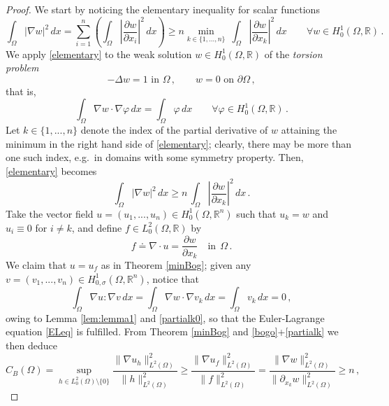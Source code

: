 \documentclass[11pt]{article}
\theoremstyle{plain}
\theoremstyle{definition}
\numberwithin{equation}{section}
\newcommand{\R}{\mathbb{R}}
\begin{document}
\noindent\begin{proof} We start by noticing the elementary inequality for scalar functions
	\begin{equation}\label{elementary}
	\int_\Omega|\nabla w|^2 \, dx=\sum_{i=1}^{n} \left( \int_\Omega \left| \dfrac{\partial w}{\partial x_{i}} \right|^2 \, dx \right) \ge n \min_{k \in \{1,...,n \} }\ \int_\Omega \left| \dfrac{\partial w}{\partial x_{k}} \right|^2\, dx \qquad
	\forall w\in H^1_0(\Omega, \mathbb{R})\, .
	\end{equation}
	We apply \eqref{elementary} to the weak solution $w\in H^1_0(\Omega, \mathbb{R})$ of the {\em torsion problem}
\begin{equation}\label{torsionpb}
- \Delta w = 1\mbox{ in }\Omega \, ,\qquad w = 0\mbox{ on }\partial \Omega \, ,
\end{equation}
that is,
\begin{equation}\label{partialk0}
\int_\Omega \nabla w \cdot \nabla \varphi \, dx = \int_\Omega \varphi \, dx\qquad \forall \varphi \in H^1_0(\Omega, \mathbb{R}) \, .
\end{equation}
Let  $k\in\{1,...,n\}$ denote  the index of the partial derivative of $w$ attaining the minimum in the right hand side of \eqref{elementary};
	clearly, there may be more than one such index, e.g.\ in domains with some symmetry property. Then, \eqref{elementary} becomes
	\begin{equation}\label{partialk}
	\int_\Omega|\nabla w|^2 \, dx\ge n\, \int_\Omega \left| \dfrac{\partial w}{\partial x_{k}} \right|^2 \, dx \, .
	\end{equation}
	Take the vector field $u=(u_1,...,u_n)\in H^1_0(\Omega, \mathbb{R}^{n})$ such that $u_k=w$ and $u_i\equiv0$ for $i\neq k$, and define $f \in L_{0}^{2}(\Omega, \R)$ by
	$$
	f\doteq\nabla\cdot u=\dfrac{\partial w}{\partial x_{k}} \quad \text{in} \ \ \Omega \, .
	$$
	We claim that $u = u_f$ as in Theorem \ref{minBog}; given any $v = (v_{1},...,v_{n}) \in H^{1}_{0,\sigma}(\Omega, \mathbb{R}^{n})$, notice that
	$$
	\int_{\Omega} \nabla u : \nabla v \, dx= \int_{\Omega} \nabla w \cdot \nabla v_{k}\, dx = \int_{\Omega} v_{k}\, dx = 0 \, ,
	$$
	owing to Lemma \ref{lem:lemma1} and \eqref{partialk0}, so that the Euler-Lagrange equation \eqref{ELeq} is fulfilled.
	From Theorem \ref{minBog} and \eqref{bogo}+\eqref{partialk} we then deduce
	$$
	C_B(\Omega)=\sup_ {h \in L^2_0(\Omega) \setminus \{0\}}\frac{\|\nabla u_h\|_{L^2(\Omega)}^2}{\|h\|_{L^2(\Omega)}^2} \geq \frac{\|\nabla u_f\|_{L^2(\Omega)}^2}{\|f\|_{L^2(\Omega)}^2}=\frac{\|\nabla w\|_{L^2(\Omega)}^2}{\|\partial_{x_k}w\|_{L^2(\Omega)}^2} \ge n \, ,
$$
\end{proof}
\end{document}
